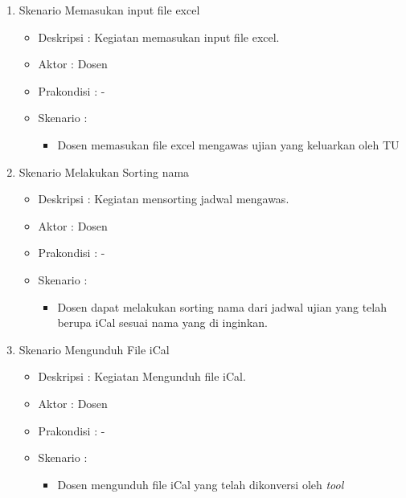 \begin{enumerate}
	\item Skenario Memasukan input file excel \\
	{\renewcommand\labelitemi{}
		\begin{itemize}
			\item Deskripsi		: Kegiatan memasukan input file excel.
			\item Aktor				: Dosen
			\item Prakondisi	: -
			\item Skenario		:
				\begin{itemize}
					\item Dosen memasukan file excel mengawas ujian yang keluarkan oleh TU
				\end{itemize}
		\end{itemize}
		}
		
	\item Skenario Melakukan Sorting nama
	{\renewcommand\labelitemi{}
	\begin{itemize}
			\item Deskripsi		: Kegiatan mensorting jadwal mengawas.
			\item Aktor				: Dosen
			\item Prakondisi	: -
			\item Skenario		:
				\begin{itemize}
					\item Dosen dapat melakukan sorting nama dari jadwal ujian yang telah berupa iCal sesuai nama yang di inginkan. 
				\end{itemize}
		\end{itemize}
		}
		
		\item Skenario Mengunduh File iCal 
		{\renewcommand\labelitemi{}
		\begin{itemize}
			\item Deskripsi		: Kegiatan Mengunduh file iCal.
			\item Aktor				: Dosen 
			\item Prakondisi	: -
			\item Skenario		:
				\begin{itemize}
					\item Dosen mengunduh file iCal yang telah dikonversi oleh \textit{tool}
				\end{itemize}
		\end{itemize}
		}
		
\end{enumerate}

